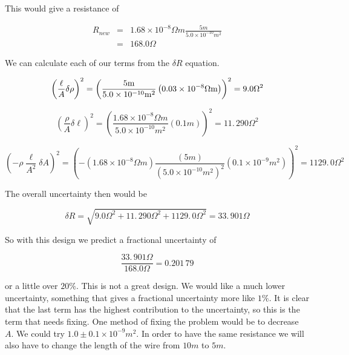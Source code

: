 \noindent This would give a resistance of 

\begin{eqnarray*}
	R_{new} &=&1.68\times 10^{-8}\unit{\Omega}\unit{m}\frac{5\unit{m}}{5.0\times 10^{-10}\unit{m}^{2}} \\
	&=&168.0\unit{\Omega}
\end{eqnarray*}

We can calculate each of our terms from the $\delta R$ equation. 

\begin{equation*}
	\left( \frac{\ell }{A}\delta \rho \right) ^{2}=\left( \frac{5\unit{m}}{%
		5.0\times 10^{-10}\unit{m}^{2}}\left( 0.03\times 10^{-8}\unit{\Omega	}\unit{m}\right) \right) ^{2}=9.0\unit{\Omega}^{2}
\end{equation*}

\begin{equation*}
	\left( \frac{\rho }{A}\delta \ell \right) ^{2}=\left( \frac{1.68\times
		10^{-8}\unit{\Omega}\unit{m}}{5.0\times 10^{-10}\unit{m}^{2}}\left( 0.1\unit{m}\right) \right) 	^{2}=11.\,\allowbreak 290\unit{\Omega}^{2}
\end{equation*}

\begin{equation*}
	\left( -\rho \frac{\ell }{A^{2}}\delta A\right) ^{2}=\left( -\left(
	1.68\times 10^{-8}\unit{\Omega}\unit{m}\right) \frac{\left( 5\unit{m}\right) }{\left( 5.0\times 10^{-10} \unit{m}^{2}\right) ^{2}}\left( 0.1\times 10^{-9}\unit{m}^{2}\right) \right)
	^{2}=1129.\,\allowbreak 0\unit{\Omega}^{2}
\end{equation*}

\noindent The overall uncertainty then would be

\begin{equation*}
	\delta R=\sqrt{9.0\unit{\Omega}^{2}+11.\,\allowbreak 290\unit{\Omega}^{2}+1129.\,\allowbreak 0\unit{\Omega}^{2}}=33.\,\allowbreak 901\unit{\Omega}
\end{equation*}

So with this design we predict a fractional uncertainty of 

\begin{equation*}
	\frac{33.\,\allowbreak 901\unit{\Omega}}{168.0\unit{\Omega}}=0.201\,79
\end{equation*}

or a little over $20\%.$ This is not a great design. We would like a much lower uncertainty, something that gives a fractional uncertainty more like $1\%.$ It is clear that the last term has the highest contribution to the uncertainty, so this is the term that needs fixing. One method of fixing the problem would be to decrease $A.$ We could try $1.0\pm 0.1\times 10^{-9}\unit{m}^{2}.$ In order to have the same resistance we will also have to change the length of the wire from $10\unit{m}$ to $5\unit{m}$. 

